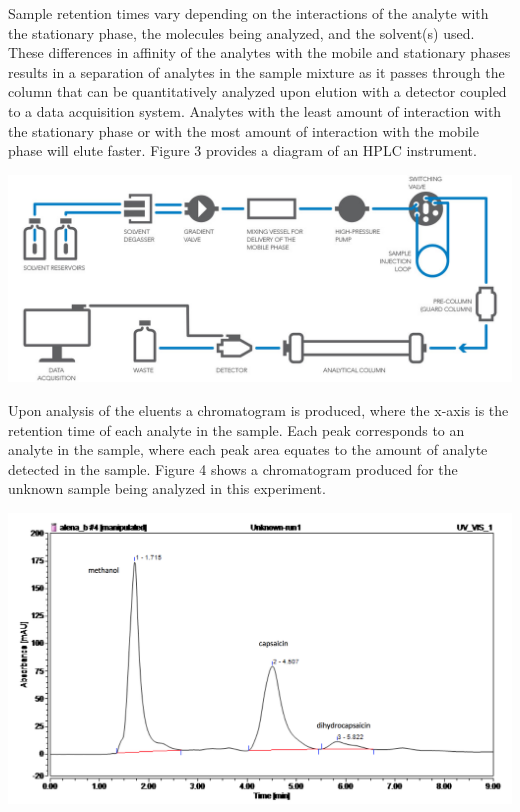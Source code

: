 \documentclass{article}
\begin{document}
\begin{multicols}{2}
{    Sample retention times vary depending on the interactions of the analyte
    with the stationary phase, the molecules being analyzed, and the solvent(s)
    used. These differences in affinity of the analytes with the mobile and
    stationary phases results in a separation of analytes in the sample mixture
    as it passes through the column that can be quantitatively analyzed upon
    elution with a detector coupled to a data acquisition system.  Analytes with
    the least amount of interaction with the stationary phase or with the most
    amount of interaction with the mobile phase will elute faster.\cite{linde}
    Figure 3 provides a diagram of an HPLC instrument.
    \begin{center}
        \includegraphics[scale=0.18]{hplc.png} 
    \end{center}

    Upon analysis of the eluents a chromatogram is produced, where the x-axis
    is the retention time of each analyte in the sample. Each peak corresponds
    to an analyte in the sample, where each peak area equates to the amount of
    analyte detected in the sample.
    Figure 4 shows a chromatogram produced for the unknown sample being analyzed
    in this experiment.
    \begin{center}
        \includegraphics[scale=0.2]{unknown1}
    \end{center}

}
\end{multicols}
\end{document}
